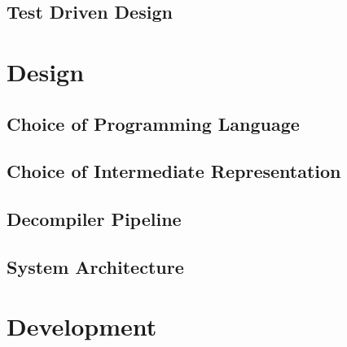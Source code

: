 \documentclass[12pt, a4paper]{article}
\begin{document}

\subsection{Test Driven Design}


\section{Design}


\subsection{Choice of Programming Language}




\subsection{Choice of Intermediate Representation}


\subsection{Decompiler Pipeline}


\subsection{System Architecture}



\section{Development}
\end{document}
